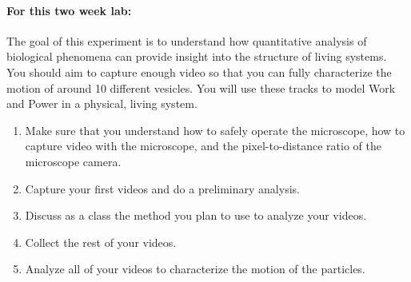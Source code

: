 \paragraph{For this two week lab:} The goal of this experiment is to understand how quantitative analysis of biological phenomena can provide insight into the structure of living systems. You should aim to capture enough video so that you can fully characterize the motion of around 10 different vesicles. You will use these tracks to model Work and Power in a physical, living system.
\begin{enumerate}
\item Make sure that you understand how to safely operate the microscope, how to capture video with the microscope, and the pixel-to-distance ratio of the microscope camera.
\item Capture your first videos and do a preliminary analysis.
\item Discuss as a class the method you plan to use to analyze your videos.
\item Collect the rest of your videos.
\item Analyze all of your videos to characterize the motion of the particles.
\end{enumerate}

